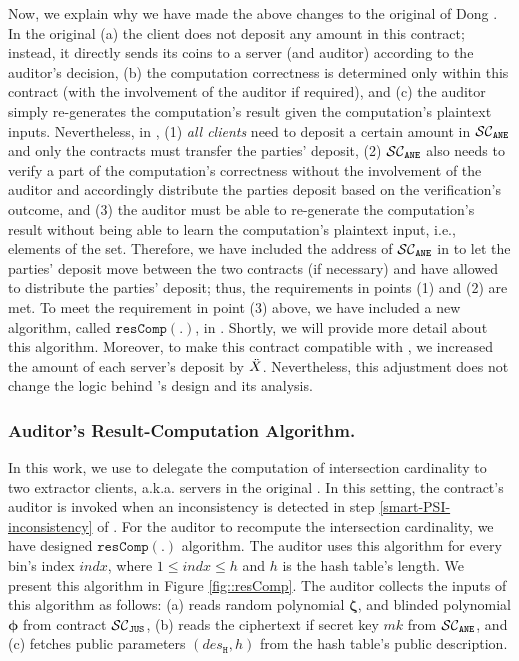 Now, we explain why we have made the above changes to the original \SCpc of Dong \et \cite{dong2017betrayal}. In the original \SCpc (a) the client does not deposit any amount in this contract; instead, it directly sends its coins to a server (and auditor) according to the auditor's decision,  (b) the computation correctness is determined only within this contract (with the involvement of the auditor if required), and (c)  the auditor simply re-generates the computation's result given the computation's plaintext inputs.  Nevertheless, in \epsi, (1) \emph{all clients} need to deposit a certain amount in $\mathcal{SC}_{\mathtt{ANE}}$ and only the contracts must transfer the parties' deposit,  (2) $\mathcal{SC}_{\mathtt{ANE}}$ also needs to verify a part of the computation's correctness without the involvement of the auditor and accordingly distribute the parties deposit based on the verification's outcome,  and (3) the auditor must be able to re-generate the computation's result without being able to learn the computation's plaintext input, i.e., elements of the set. Therefore, we have included the address of $\mathcal{SC}_{\mathtt{ANE}}$ in \SCpc to let the parties' deposit move between the two contracts (if necessary) and have allowed \SCpc to distribute the parties' deposit; thus, the requirements in points (1) and (2) are met. To meet the requirement in point (3) above, we have included a new algorithm, called $\mathtt{resComp}(.)$, in \SCpc.  Shortly, we will provide more detail about this algorithm. Moreover, to make this contract compatible with \epsi, we increased the amount of each server's deposit by  $\ddot{X}$. Nevertheless, this adjustment does not change the logic behind \SCpc's design and its analysis.  







\subsubsection{Auditor's Result-Computation Algorithm.}\label{sec::auditor-res-Comp}


In this work,  we use \SCpc to delegate the computation of intersection cardinality to two extractor clients, a.k.a. servers in the original \SCpc. In this setting, the contract's auditor is invoked when an inconsistency is detected in step \ref{smart-PSI-inconsistency} of \epsi. For the auditor to recompute the intersection cardinality, we have designed $\mathtt{resComp}(.)$ algorithm. The auditor uses this algorithm for every bin's index $indx$,  where $1\leq indx\leq h$ and $h$ is the hash table's length. We present this algorithm in Figure \ref{fig::resComp}.  The auditor collects the inputs of this algorithm as follows: (a)  reads random polynomial $\bm\zeta$, and blinded polynomial $\bm\phi$ from contract $\mathcal{SC}_{\mathtt{JUS}}$, (b) reads the ciphertext if secret key $mk$ from $\mathcal{SC}_{\mathtt{ANE}}$, and (c) fetches public parameters $(des_{\mathtt{H}}, h)$ from the hash table's public description. 



